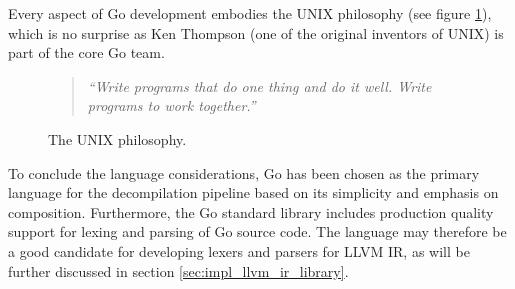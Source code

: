 Every aspect of Go development embodies the UNIX philosophy (see figure \ref{fig:unix_philosophy}), which is no surprise as Ken Thompson (one of the original inventors of UNIX) is part of the core Go team.

\begin{figure}[htbp]
	\begin{center}
		\begin{quote}
			\textit{``Write programs that do one thing and do it well. Write programs to work together.''} \cite{art_of_unix}
		\end{quote}
		\caption{The UNIX philosophy.}
		\label{fig:unix_philosophy}
	\end{center}
\end{figure}

To conclude the language considerations, Go has been chosen as the primary language for the decompilation pipeline based on its simplicity and emphasis on composition. Furthermore, the Go standard library includes production quality support for lexing and parsing of Go source code. The language may therefore be a good candidate for developing lexers and parsers for LLVM IR, as will be further discussed in section \ref{sec:impl_llvm_ir_library}.
